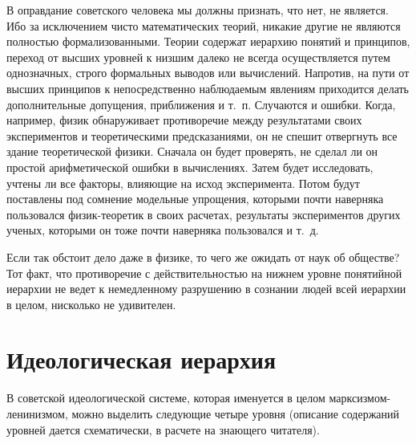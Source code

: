 \documentclass{book}
\begin{document}
В оправдание советского человека мы должны признать, что нет, не является. Ибо за исключением чисто математических теорий, 
никакие другие не являются полностью формализованными.  Теории содержат иерархию понятий и принципов, переход от высших уровней 
к низшим далеко не всегда осу­ществляется путем однозначных, строго формальных выводов или вычислений. Напротив, на пути от 
высших принципов к непосредственно наблюдаемым явлениям приходится делать дополнительные допущения, приближения и т.~п. 
Случаются и ошибки. Когда, например, физик обнаруживает противоречие между результатами своих экспериментов и теоретическими 
предсказаниями, он не спешит отвергнуть все здание теоре­тической физики. Сначала он будет проверять, не сделал ли он простой 
арифметической ошибки в вычислениях. Затем будет исследовать, учтены ли все факторы, влияющие на исход эксперимента. Потом будут 
поставлены под сомнение модель­ные упрощения, которыми почти наверняка пользовался фи­зик-теоретик в своих расчетах, результаты 
экспериментов других ученых, которыми он тоже почти наверняка пользо­вался и т.~д.

Если так обстоит дело даже в физике, то чего же ожидать от наук об обществе? Тот факт, что противоречие с действи­тельностью на 
нижнем уровне понятийной иерархии не ведет к немедленному разрушению в сознании людей всей иерархии в целом, нисколько не 
удивителен.

\section{Идеологическая иерархия}

В советской идеологической системе, которая именуется в целом марксизмом-ленинизмом, можно выделить следующие четыре уровня 
(описание содержаний уровней дается схематически, в расчете на знающего читателя).
\end{document}
